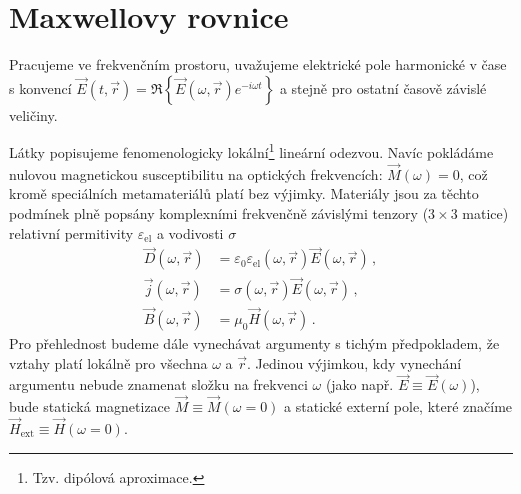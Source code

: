 \section{Maxwellovy rovnice}
\label{chap:maxwellovy-rovnice}

Pracujeme ve frekvenčním prostoru, uvažujeme elektrické pole harmonické v čase s konvencí $\vec{E}(t,\vec{r})=\Re\left\lbrace\vec{E}(\omega,\vec{r}) e^{-i\omega t}\right\rbrace$ a stejně pro ostatní časově závislé veličiny.

Látky popisujeme fenomenologicky lokální\footnote{Tzv. dipólová aproximace.} lineární odezvou.
Navíc pokládáme nulovou magnetickou susceptibilitu na optických frekvencích: $\vec{M}(\omega)=0$, což kromě speciálních metamateriálů platí bez výjimky\cite{lindenPhotonicMetamaterialsMagnetism2006}.
Materiály jsou za těchto podmínek plně popsány komplexními frekvenčně závislými tenzory ($3\times 3$ matice) relativní permitivity $\varepsilon_{\textrm{el}}$ a vodivosti $\sigma$
\begin{align}
    \vec{D}(\omega,\vec{r})&=\varepsilon_0 \varepsilon_{\textrm{el}}(\omega,\vec{r})\vec{E}(\omega,\vec{r}) \,, \label{eqn:materialy-D} \\
    \vec{j}(\omega,\vec{r})&=\sigma(\omega,\vec{r})\vec{E}(\omega,\vec{r}) \,, \label{eqn:materialy-J} \\
    \vec{B}(\omega,\vec{r})&=\mu_0 \vec{H}(\omega,\vec{r})  \,. \label{eqn:materialy-B}
\end{align}
Pro přehlednost budeme dále vynechávat argumenty s tichým předpokladem, že vztahy platí lokálně pro všechna $\omega$ a $\vec{r}$.
Jedinou výjimkou, kdy vynechání argumentu nebude znamenat složku na frekvenci $\omega$ (jako např. $\vec{E}\equiv\vec{E}(\omega)$), bude statická magnetizace $\vec{M}\equiv\vec{M}(\omega=0)$ a statické externí pole, které značíme $\vec{H}_{\textrm{ext}}\equiv\vec{H}(\omega=0)$.

